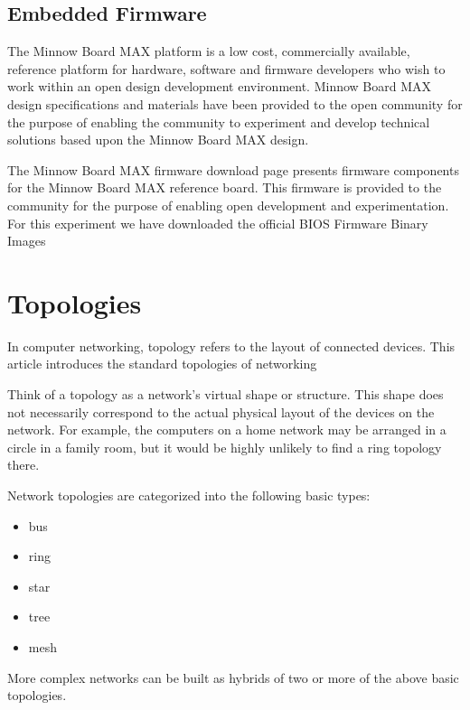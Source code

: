 \subsection{Embedded Firmware}

The Minnow Board MAX platform is a low cost, commercially available, reference
platform for hardware, software and firmware developers who wish to work within
an open design development environment. Minnow Board MAX design specifications
and materials have been provided to the open community for the purpose of
enabling the community to experiment and develop technical solutions based upon
the Minnow Board MAX design.

The Minnow Board MAX firmware download page presents firmware components for the
Minnow Board MAX reference board. This firmware is provided to the community for
the purpose of enabling open development and experimentation. For this
experiment we have downloaded the official BIOS Firmware Binary Images
\cite{minnowmax-firmware}

\section{Topologies}

In computer networking, topology refers to the layout of connected devices. This
article introduces the standard topologies of networking

Think of a topology as a network's virtual shape or structure. This shape does
not necessarily correspond to the actual physical layout of the devices on the
network. For example, the computers on a home network may be arranged in a
circle in a family room, but it would be highly unlikely to find a ring
topology there.

Network topologies are categorized into the following basic types:

\begin{itemize}
    \item bus
    \item ring
    \item star
    \item tree
    \item mesh
\end{itemize}

More complex networks can be built as hybrids of two or more of the above basic
topologies.

